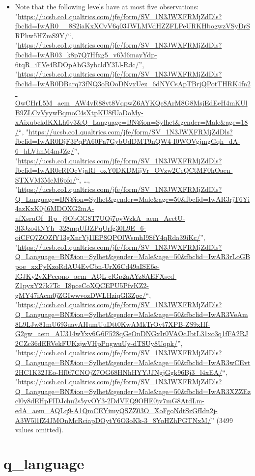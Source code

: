 \documentclass[
]{report}
\providecommand{\tightlist}{%
  \setlength{\itemsep}{0pt}\setlength{\parskip}{0pt}}
\begin{document}
\begin{itemize}
\tightlist
\item
  Note that the following levels have at most five observations:
  "\url{https://ucsb.co1.qualtrics.com/jfe/form/SV_1N3JWXFRMjZdDls?fbclid=IwAR0__8S2iaKxXCvV6q03JWLMVdHZZFLPeURKHbogwzVSyDrSRPhw5HZmS9Y/}``,
  "\url{https://ucsb.co1.qualtrics.com/jfe/form/SV_1N3JWXFRMjZdDls?fbclid=IwAR03_k8p7Q7Hfxg5_v6M6mayYdp-6tqR_iFVe4RDOpAbG3ybcldY3Ll-Rdc/}'',
  "\url{https://ucsb.co1.qualtrics.com/jfe/form/SV_1N3JWXFRMjZdDls?fbclid=IwAR0DBarq73fNQ3oROoDNvxUez_6dNYCsApTBrjQPotTHRK4fn2-OwCHrL5M_aem_AW4vR88vt8VqpwZ6AYKQc8ArM8G8MsjEdEeH4mKUlB9ZLCvVyywBqmoC4sXtpKU8fUaDoMy-xAixubckdKXLh6v3\&Q_Language=BN®ion=Sylhet\&gender=Male\&age=18/}``,
  "\url{https://ucsb.co1.qualtrics.com/jfe/form/SV_1N3JWXFRMjZdDls?fbclid=IwAR0DjF3PqPA60Pa7GybUdDMT9nQW4-I0WOVgjmgGqh_dA-6_hLVhnM4mJZg/}'',
  "\url{https://ucsb.co1.qualtrics.com/jfe/form/SV_1N3JWXFRMjZdDls?fbclid=IwAR0eRIOcVjaRl_oxY0DKDMijVr_OVzw2CeQCtMF0hOaen-STXVM3MeM6pfo/}``,
  \ldots,
  "\url{https://ucsb.co1.qualtrics.com/jfe/form/SV_1N3JWXFRMjZdDls?Q_Language=BN®ion=Sylhet\&gender=Male\&age=50\&fbclid=IwAR3rjT6Yi4azKxK0jl6MDOXG2mA-nfXsruOf_Rp_j9ObGG8T7UQj7pyWzkA_aem_AectU-3l3Jzo4tNYh_328mqUfJZPqUrfg30L9E_6-oiCFQ7ZOZfY13gXnrYj1lEP8QPOlWsmhI9SfY4qRda39iKc/}'',
  "\url{https://ucsb.co1.qualtrics.com/jfe/form/SV_1N3JWXFRMjZdDls?Q_Language=BN®ion=Sylhet\&gender=Male\&age=50\&fbclid=IwAR3rLoGBpoe_xxPyKzoRdAU4EvCbn-UrX6Cd49aISE6e-lGJKy2vXPecpno_aem_AQL-clGp2aAYz8AEFXsed-Z1pyxY27k7Tc_I8pceCoXQCEPU5PfvKZ2-gMY47iAcm0jZGIwwvozDWLHziqGl3Zpc/}``,
  "\url{https://ucsb.co1.qualtrics.com/jfe/form/SV_1N3JWXFRMjZdDls?Q_Language=BN®ion=Sylhet\&gender=Male\&age=50\&fbclid=IwAR3VeAm8L9LJw81mU693uavAHumUuDtt0KwAMkTrOvt7XPB-ZS9xHf-G2gw_aem_AU314wYxv6G6F528qGeOnDNGxIr0VAOcJbtL31xo3q1fFA2RJ2CZc36dERVekFUKzjwVHpPngwuUy-dTSUy8Uqpk/}'',
  "\url{https://ucsb.co1.qualtrics.com/jfe/form/SV_1N3JWXFRMjZdDls?Q_Language=BN®ion=Sylhet\&gender=Male\&age=50\&fbclid=IwAR3wCEvt2HC1K32JEo-Hf0f7CNOjZ7OG68HNhHYYJJNgjGgk96Bj3_l4xEA/}``,
  "\url{https://ucsb.co1.qualtrics.com/jfe/form/SV_1N3JWXFRMjZdDls?Q_Language=BN®ion=Sylhet\&gender=Male\&age=50\&fbclid=IwAR3XZZEzcl0y8dEHpFIDJchu2s5yvOY3-2DdVEQ9OHE0jv7mG8AtdLm-edA_aem_AQLq9-A1QmCEYimyQSZZ03O_XoFgoNdtSzGfIdn2j-A3W5l1fZ4JMOnMcRciapDOytY6O3oKk-3_8YoHZhPGTNxM/}''
  (3499 values omitted).
\end{itemize}

\noindent\makebox[\linewidth]{\rule{\textwidth}{0.4pt}}

\hypertarget{q_language}{%
\section{q\_language}\label{q_language}}
\end{document}
